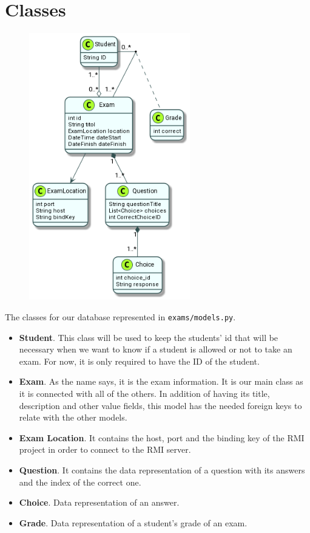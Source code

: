 \documentclass{article}
\begin{document}
\section{Classes}
\begin{figure}[H]
	\centering
	\includegraphics[width=7cm]{imgs/models.png}
\end{figure}
The classes for our database represented in \texttt{exams/models.py}.
\begin{itemize}
	\item \textbf{Student}. This class will be used to keep the students’ id that will be necessary when we want to know if a student is allowed or not to take an exam. For now, it is only required to have the ID of the student.
	\item \textbf{Exam}. As the name says, it is the exam information. It is our main class as it is connected with all of the others. In addition of having its title, description and other value fields, this model has the needed foreign keys to relate with the other models.
	\item \textbf{Exam Location}. It contains the host, port and the binding key of the RMI project in order to connect to the RMI server.
	\item \textbf{Question}. It contains the data representation of a question with its answers and the index of the correct one.
	\item \textbf{Choice}. Data representation of an answer.
	\item \textbf{Grade}. Data representation of a student's grade of an exam.
\end{itemize}
\end{document}

